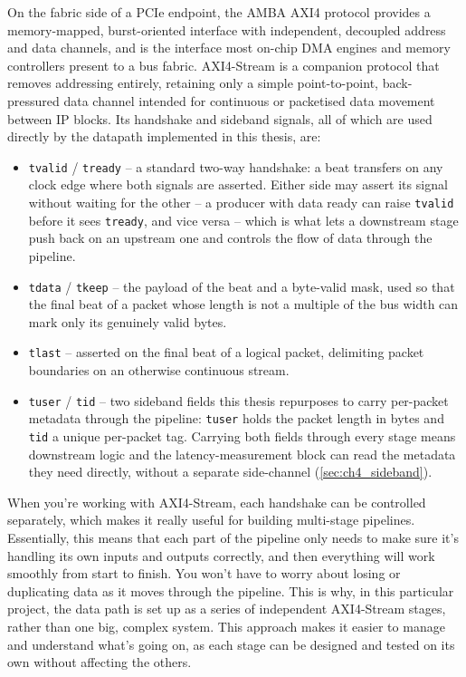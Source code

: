 On the fabric side of a PCIe endpoint, the \ac{AMBA} \ac{AXI4} protocol \cite{arm2021axi} provides a memory-mapped, burst-oriented interface with independent, decoupled address and data channels, and is the interface most on-chip DMA engines and memory controllers present to a bus fabric. \ac{AXI4-Stream} \cite{arm2010axistream} is a companion protocol that removes addressing entirely, retaining only a simple point-to-point, back-pressured data channel intended for continuous or packetised data movement between IP blocks. Its handshake and sideband signals, all of which are used directly by the datapath implemented in this thesis, are:

\begin{itemize}
\item \texttt{tvalid} / \texttt{tready} -- a standard two-way handshake: a beat transfers on any clock edge where both signals are asserted. Either side may assert its signal without waiting for the other -- a producer with data ready can raise \texttt{tvalid} before it sees \texttt{tready}, and vice versa -- which is what lets a downstream stage push back on an upstream one and controls the flow of data through the pipeline.
\item \texttt{tdata} / \texttt{tkeep} -- the payload of the beat and a byte-valid mask, used so that the final beat of a packet whose length is not a multiple of the bus width can mark only its genuinely valid bytes.
\item \texttt{tlast} -- asserted on the final beat of a logical packet, delimiting packet boundaries on an otherwise continuous stream.
\item \texttt{tuser} / \texttt{tid} -- two sideband fields this thesis repurposes to carry per-packet metadata through the pipeline: \texttt{tuser} holds the packet length in bytes and \texttt{tid} a unique per-packet tag. Carrying both fields through every stage means downstream logic and the latency-measurement block can read the metadata they need directly, without a separate side-channel (\autoref{sec:ch4_sideband}).
\end{itemize}

When you're working with AXI4-Stream, each handshake can be controlled separately, which makes it really useful for building multi-stage pipelines. Essentially, this means that each part of the pipeline only needs to make sure it's handling its own inputs and outputs correctly, and then everything will work smoothly from start to finish. You won't have to worry about losing or duplicating data as it moves through the pipeline. This is why, in this particular project, the data path is set up as a series of independent AXI4-Stream stages, rather than one big, complex system. This approach makes it easier to manage and understand what's going on, as each stage can be designed and tested on its own without affecting the others.


